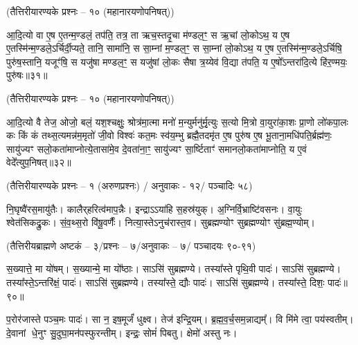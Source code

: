 \begin{minipage}{\linewidth}
\centerline{\scriptsize (तैत्तिरीयारण्यके प्रश्नः – १० (महानारयणोपनिषत्))}
आ॒दि॒त्यो वा ए॒ष ए॒तन्म॒ण्डलं॒ तप॑ति॒ तत्र॒ ता ऋच॒स्तदृ॒चा म॑ण्डल॒ꣳ॒ स ऋ॒चां लो॒कोऽथ॒ य ए॒ष ए॒तस्मि॑न्म॒ण्डले॒ऽर्चिर्दी॒प्यते॒ तानि॒ सामा॑नि॒ स सा॒म्नां म॒ण्डल॒ꣳ॒ स सा॒म्नां लो॒कोऽथ॒ य ए॒ष ए॒तस्मि॑न्म॒ण्डले॒ऽर्चिषि॒ पुरु॑ष॒स्तानि॒ यजूꣳ॑षि॒ स यजु॑षा मण्डल॒ꣳ॒ स यजु॑षां लो॒कः सैषा त्र॒य्येव॑ वि॒द्या त॑पति॒ य ए॒षो᳚ऽन्तरा॑दि॒त्ये हि॑र॒ण्मयः॒ पुरु॑षः॥३१॥
\end{minipage}


\begin{minipage}{\linewidth}
\centerline{\scriptsize (तैत्तिरीयारण्यके प्रश्नः – १० (महानारयणोपनिषत्))}
आ॒दि॒त्यो वै तेज॒ ओजो॒ बलं॒ यश॒श्चक्षुः॒ श्रोत्र॑मा॒त्मा मनो॑ म॒न्युर्मनु॑र्मृ॒त्युः स॒त्यो मि॒त्रो वा॒युरा॑का॒शः प्रा॒णो लो॑कपा॒लः कः किं कं तथ्स॒त्यमन्न॑म॒मृतो॑ जी॒वो विश्वः॑ कत॒मः स्व॑य॒म्भु ब्रह्मै॒तदमृ॑त ए॒ष पुरु॑ष ए॒ष भू॒ताना॒मधि॑पति॒र्ब्रह्म॑णः॒ सायु॑ज्यꣳ सलो॒कता॑माप्नोत्ये॒तासा॑मे॒व दे॒वता॑ना॒ꣳ॒ सायु॑ज्यꣳ सा॒र्ष्टिताꣳ॑ समानलो॒कता॑माप्नोति॒ य ए॒वं वेदे᳚त्युप॒निषत्॥३२॥
\end{minipage}


\closesection
\clearpage
 
\clearpage



\begin{minipage}{\linewidth}
\centerline{\scriptsize (तैत्तिरीयारण्यके प्रश्नः – १ (अरुणप्रश्नः) / अनुवाकः - १२/ पञ्चादिः ५८)}
नि॒घृष्वै॑रस॒मायु॑तैः। कालैर्‌हरित्व॑माप॒न्नैः। 
इन्द्राऽऽया॑हि स॒हस्र॑\-युक्। अ॒ग्निर्वि॒भ्राष्टि॑वसनः। 
वा॒युः श्वेत॑सिकद्रु॒कः। सं॒व॒थ्स॒रो वि॑षू॒\-वर्णैः᳚। 
नित्या॒स्तेऽ\-नु\-च॑रास्त॒व। सुब्रह्मण्योꣳ सुब्रह्मण्योꣳ सु॑ब्रह्म॒ण्योम्। 
\end{minipage}

\begin{minipage}{\linewidth}
\centerline{\scriptsize (तैत्तिरीयब्राह्मणे अष्टकं – ३/प्रश्नः – ७/अनुवाकः – ७/ पञ्चादयः ९०-९१)}
स॒ख्यात्ते॒ मा यो॑षम्।
स॒ख्यान्मे॒ मा यो᳚ष्ठाः।
साऽसि॑ सुब्रह्मण्ये।
तस्या᳚स्ते पृथि॒वी पादः॑।
साऽसि॑ सुब्रह्मण्ये।
तस्या᳚स्ते॒\-ऽन्तरि॑क्षं॒ पादः॑।
साऽसि॑ सुब्रह्मण्ये।
तस्या᳚स्ते॒ द्यौः पादः॑।
साऽसि॑ सुब्रह्मण्ये।
तस्या᳚स्ते॒ दिशः॒ पादः॑॥९०॥

प॒रोर॑जास्ते पञ्च॒मः पादः॑।
सा न॒ इष॒मूर्जं॑ धुक्ष्व।
तेज॑ इन्द्रि॒यम्।
ब्र॒ह्म॒व॒र्च॒सम॒न्नाद्यम्᳚।
वि मि॑मे त्वा॒ पय॑स्वतीम्।
दे॒वानां धे॒नुꣳ सु॒दुघा॒मन॑पस्फुरन्तीम्।
इन्द्रः॒ सोमं॑ पिबतु।
क्षेमो॑ अस्तु नः।
\end{minipage}

